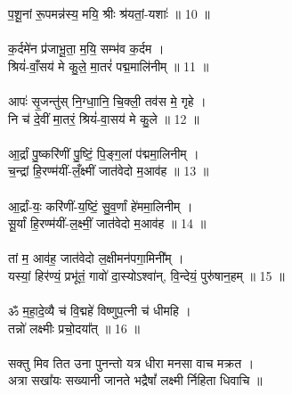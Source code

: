 प॒शू॒नां रू॒पमन्न॑स्य॒ मयि॒ श्रीः श्र॑यतां॒-यशाः॑ ॥ 10 ॥\\
\\
क॒र्दमे॑न प्र॑जाभू॒ता॒ म॒यि॒ सम्भ॑व क॒र्दम ।\\
श्रियं॑-वाँ॒सय॑ मे कु॒ले॒ मा॒तरं॑ पद्म॒मालि॑नीम् ॥ 11 ॥\\
\\
आपः॑ सृ॒जन्तु॑स् नि॒ग्धाा॒नि॒ चि॒क्ली॒ तव॑स मे॒ गृहे ।\\
नि च॑ दे॒वीं मा॒तरं॒ श्रियं॑-वा॒सय॑ मे कु॒ले ॥ 12 ॥\\
\\
आ॒र्द्रां पु॒ष्करि॑णीं पु॒ष्टिं॒ पि॒ङ्ग॒लां प॑द्ममा॒लिनीम् ।\\
च॒न्द्रां हि॒रण्म॑यीं-लँ॒क्ष्मीं जात॑वेदो म॒आव॑ह ॥ 13 ॥\\
\\
आ॒र्द्रां-यः॒ करि॑णीं-य॒ष्टिं॒ सु॒व॒र्णां हे॑ममा॒लिनीम् ।\\
सू॒र्यां हि॒रण्म॑यीं-ल॒क्ष्मीं॒ जात॑वेदो म॒आव॑ह ॥ 14 ॥\\
\\
तां म॒ आव॑ह॒ जात॑वेदो ल॒क्षीमन॑पगा॒मिनी᳚म् ।\\
यस्यां॒ हिर॑ण्यं॒ प्रभू॑तं॒ गावो॑ दा॒स्योऽश्वा॑न्, वि॒न्देयं॒ पुरु॑षान॒हम् ॥ 15 ॥\\
\\
ॐ म॒हा॒दे॒व्यै च॑ वि॒द्महे॑ विष्णुप॒त्नी च॑ धीमहि ।\\
तन्नो॑ लक्ष्मीः प्रचो॒दया᳚त् ॥ 16 ॥\\
\\
सक्तु मिव तित उना पुनन्तो यत्र धीरा मनसा वाच मक्रत । \\
अत्रा सखा᳚यः सख्यानी जानते भद्रैषां᳚ लक्ष्मी र्निहिता धिवाचि ॥\\
